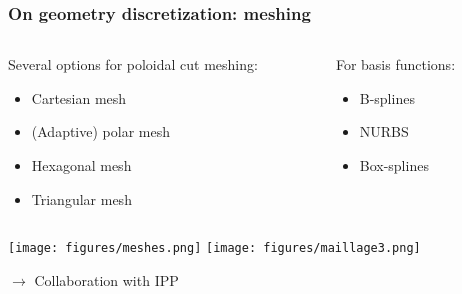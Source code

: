 \documentclass[10pt]{beamer}
\begin{document}
\begin{frame}
\frametitle{On geometry discretization: meshing}


\begin{columns}
\begin{column}{0.6\textwidth}
Several options for poloidal cut meshing:

\begin{itemize}
	\item Cartesian mesh
	\item (Adaptive) polar mesh
	\item Hexagonal mesh
	\item Triangular mesh
\end{itemize}

\end{column}
\begin{column}{0.4\textwidth}

For basis functions:

\begin{itemize}
	\item B-splines
	\item NURBS
	\item Box-splines
\end{itemize}
\end{column}
\end{columns}



\begin{center}
	\texttt{[image: figures/meshes.png]}
	\texttt{[image: figures/maillage3.png]}

\end{center}
\vspace{-0.5cm}

\begin{alertblock}{$\longrightarrow$ Collaboration with IPP}
\end{alertblock}
\end{frame}
\end{document}
